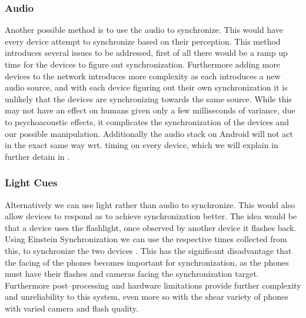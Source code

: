 \subsubsection{Audio}
Another possible method is to use the audio to synchronize.
This would have every device attempt to synchronize based on their perception.
This method introduces several issues to be addressed, first of all there would be a ramp up time for the devices to figure out synchronization.
Furthermore adding more devices to the network introduces more complexity as each introduces a new audio source, and with each device figuring out their own synchronization it is unlikely that the devices are synchronizing towards the same source.
While this may not have an effect on humans given only a few milliseconds of variance, due to psychoacoustic effects, it complicates the synchronization of the devices and our possible manipulation.
Additionally the audio stack on Android will not act in the exact same way wrt. timing on every device, which we will explain in further detain in . 

\subsubsection{Light Cues}
Alternatively we can use light rather than audio to synchronize.
This would also allow devices to respond as to achieve synchronization better.
The idea would be that a device uses the flashlight, once observed by another device it flashes back.
Using Einstein Synchronization we can use the respective times collected from this, to synchronize the two devices \cite{einstein}.
This has the significant disadvantage that the facing of the phones becomes important for synchronization, as the phones must have their flashes and cameras facing the synchronization target.
Furthermore post--processing and hardware limitations provide further complexity and unreliability to this system, even more so with the shear variety of phones with varied camera and flash quality.


